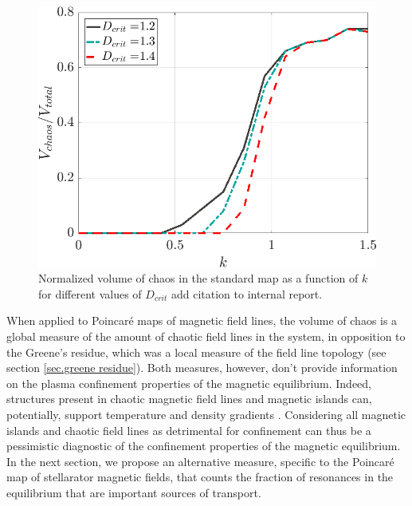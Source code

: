 \documentclass[my_thesis.tex]{subfiles}
\begin{document}
\begin{figure}
	\centering
	\includegraphics[width=.7\linewidth]{images/std_map_vchaos.png}
	\caption{Normalized volume of chaos in the standard map as a function of $k$ for different values of $D_{crit}$ {\color{red} add citation to internal report}.}
	\label{fig. std_map_v_chaos}
\end{figure}

When applied to Poincar\'e maps of magnetic field lines, the volume of chaos is a global measure of the amount of chaotic field lines in the system, in opposition to the Greene's residue, which was a local measure of the field line topology (see section \ref{sec.greene residue}). Both measures, however, don't provide information on the plasma confinement properties of the magnetic equilibrium. Indeed, structures present in chaotic magnetic field lines and magnetic islands can, potentially, support temperature and density gradients \citep{Hudson2008,hudsonAreGhostSurfaces2009}. Considering all magnetic islands and chaotic field lines as detrimental for confinement can thus be a pessimistic diagnostic of the confinement properties of the magnetic equilibrium. In the next section, we propose an alternative measure, specific to the Poincar\'e map of stellarator magnetic fields, that counts the fraction of resonances in the equilibrium that are important sources of transport.
\end{document}

